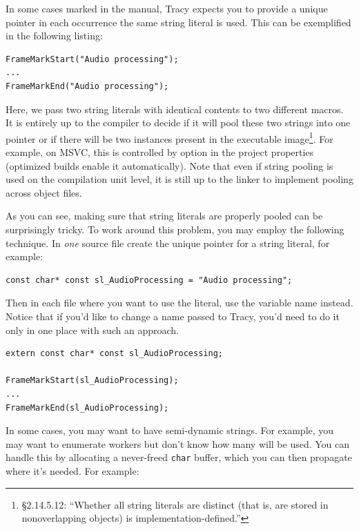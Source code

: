 \documentclass[hidelinks,titlepage,a4paper,twoside]{article}
\begin{document}
In some cases marked in the manual, Tracy expects you to provide a unique pointer in each occurrence the same string literal is used. This can be exemplified in the following listing:

\begin{lstlisting}
FrameMarkStart("Audio processing");
...
FrameMarkEnd("Audio processing");
\end{lstlisting}

Here, we pass two string literals with identical contents to two different macros. It is entirely up to the compiler to decide if it will pool these two strings into one pointer or if there will be two instances present in the executable image\footnote{\cite{ISO:2012:III} \S 2.14.5.12: \enquote{Whether all string literals are distinct (that is, are stored in nonoverlapping objects) is implementation-defined.}}. For example, on MSVC, this is controlled by  option in the project properties (optimized builds enable it automatically). Note that even if string pooling is used on the compilation unit level, it is still up to the linker to implement pooling across object files.

As you can see, making sure that string literals are properly pooled can be surprisingly tricky. To work around this problem, you may employ the following technique. In \emph{one} source file create the unique pointer for a string literal, for example:

\begin{lstlisting}
const char* const sl_AudioProcessing = "Audio processing";
\end{lstlisting}

Then in each file where you want to use the literal, use the variable name instead. Notice that if you'd like to change a name passed to Tracy, you'd need to do it only in one place with such an approach.

\begin{lstlisting}
extern const char* const sl_AudioProcessing;

FrameMarkStart(sl_AudioProcessing);
...
FrameMarkEnd(sl_AudioProcessing);
\end{lstlisting}

In some cases, you may want to have semi-dynamic strings. For example, you may want to enumerate workers but don't know how many will be used. You can handle this by allocating a never-freed \texttt{char} buffer, which you can then propagate where it's needed. For example:
\end{document}
